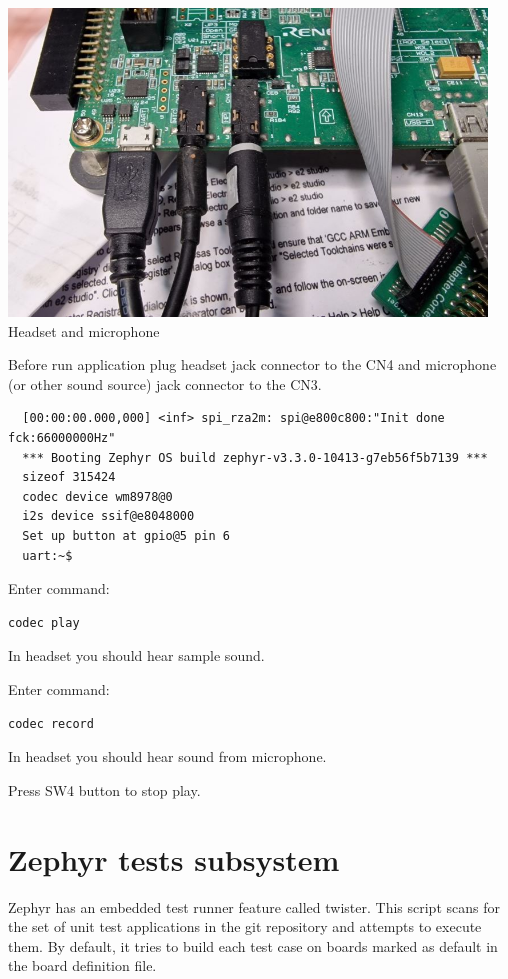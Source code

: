 \documentclass[11pt,a4paper,oneside]{article}
\begin{document}
\begin{center}
\includegraphics[width=5in,height=3.22in]{./media/codec.jpg}
\newline
Headset and microphone
\newline
\end{center}

Before run application plug headset jack connector to the CN4 and microphone
(or other sound source) jack connector to the CN3.

\begin{lstlisting}
  [00:00:00.000,000] <inf> spi_rza2m: spi@e800c800:"Init done fck:66000000Hz"
  *** Booting Zephyr OS build zephyr-v3.3.0-10413-g7eb56f5b7139 ***
  sizeof 315424
  codec device wm8978@0
  i2s device ssif@e8048000
  Set up button at gpio@5 pin 6
  uart:~$
\end{lstlisting}

Enter command:
\begin{lstlisting}
codec play
\end{lstlisting}

In headset you should hear sample sound.

Enter command:
\begin{lstlisting}
codec record
\end{lstlisting}

In headset you should hear sound from microphone.

Press SW4 button to stop play.

\section{Zephyr tests subsystem}\label{zephyr-tests-subsystem}

Zephyr has an embedded test runner feature called twister. This script
scans for the set of unit test applications in the git repository and
attempts to execute them. By default, it tries to build each test case
on boards marked as default in the board definition file.
\end{document}

